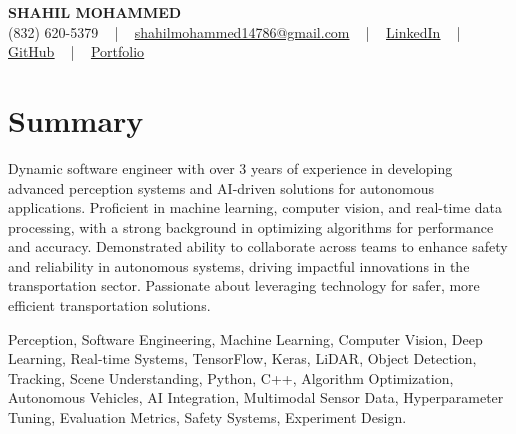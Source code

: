 \documentclass[letterpaper,10pt]{article}
\begin{document}
\begin{center}
    {\fontsize{14pt}{12pt}\selectfont \textbf{\MakeUppercase{Shahil Mohammed}}}\\ \vspace{2pt}
    \fontsize{10pt}{12pt}\selectfont (832) 620-5379 ~ | ~ \href{mailto:shahilmohammed14786@gmail.com}{shahilmohammed14786@gmail.com} ~ | ~  
    \href{https://www.linkedin.com/in/shahil-mohammed-9652931a1/}{\color{blue}\underline{LinkedIn}}  ~ | ~ 
    \href{https://github.com/freakbeast14}{\color{blue}\underline{GitHub}} ~ | ~ 
    \href{https://shahil-mohammed.netlify.app/}{\color{blue}\underline{Portfolio}}
    \vspace{-8pt}
\end{center}

\section{Summary}
\vspace{-2pt}\fontsize{8pt}{9pt}\selectfont
Dynamic software engineer with over 3 years of experience in developing advanced perception systems and AI-driven solutions for autonomous applications. Proficient in machine learning, computer vision, and real-time data processing, with a strong background in optimizing algorithms for performance and accuracy. Demonstrated ability to collaborate across teams to enhance safety and reliability in autonomous systems, driving impactful innovations in the transportation sector. Passionate about leveraging technology for safer, more efficient transportation solutions.
 \vspace{-5pt}
 
{\fontsize{1pt}{1pt}\selectfont\color{white}
Perception, Software Engineering, Machine Learning, Computer Vision, Deep Learning, Real-time Systems, TensorFlow, Keras, LiDAR, Object Detection, Tracking, Scene Understanding, Python, C++, Algorithm Optimization, Autonomous Vehicles, AI Integration, Multimodal Sensor Data, Hyperparameter Tuning, Evaluation Metrics, Safety Systems, Experiment Design.
}
\vspace{-8pt}

\vspace{-2pt}
\end{document}
